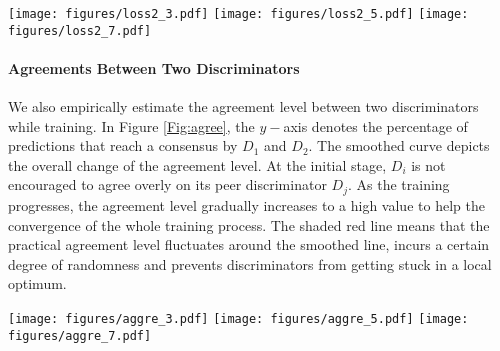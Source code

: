 \begin{figure*}[!htb]
\vspace{-0.15in}
\centering
{\texttt{[image: figures/loss2\_3.pdf]}
    }
{\texttt{[image: figures/loss2\_5.pdf]} 
    }
    {\texttt{[image: figures/loss2\_7.pdf]}
    }
        \vspace{-5pt}
        \caption{The loss of $D_2$ in \PG{} with $\beta=0.25$ on STL-10 dataset, left: $\alpha=0.3$; middle: $0.5$; right: $\alpha=0.7$.}
    \label{Fig:loss2}
\end{figure*}

\paragraph{\textbf{Agreements Between Two Discriminators}}
We also empirically estimate the agreement level between two discriminators while training. In Figure \ref{Fig:agree}, the $y-$axis denotes the percentage of predictions that reach a consensus by $D_1$ and $D_2$. The smoothed curve depicts the overall change of the agreement level. At the initial stage, $D_i$ is not encouraged to agree overly on its peer discriminator $D_j$. As the training progresses, the agreement level gradually increases to a high value to help the convergence of the whole training process. The shaded red line means that the practical agreement level fluctuates around the smoothed line, incurs a certain degree of randomness and prevents discriminators from getting stuck in a local optimum.

\begin{figure*}[!htb]
\vspace{-0.15in}
    \centering
    {\texttt{[image: figures/aggre\_3.pdf]}
    } 
    {\texttt{[image: figures/aggre\_5.pdf]} 
    }
    {\texttt{[image: figures/aggre\_7.pdf]}
    }
        \vspace{-5pt}
        \caption{The agreement level between $D_1$ and $D_2$ in \PG{} with $\beta=0.25$ on STL-10 dataset, left: $\alpha=0.3$; middle: $0.5$; right: $\alpha=0.7$.}
    \label{Fig:agree}
\end{figure*}

